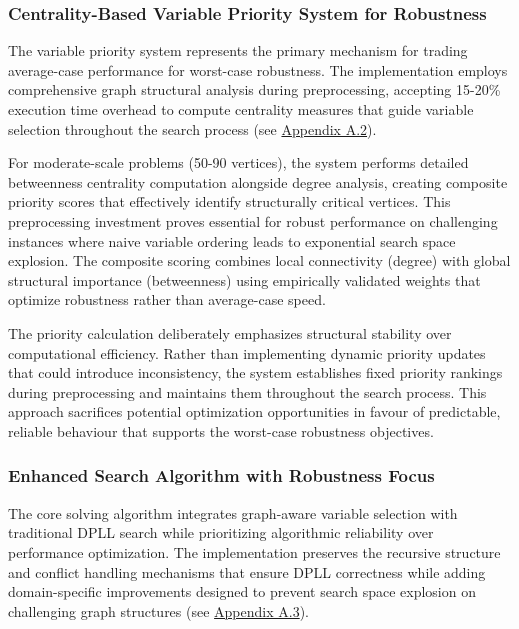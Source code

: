 \subsubsection{Centrality-Based Variable Priority System for Robustness}

The variable priority system represents the primary mechanism for trading average-case performance for worst-case robustness. The implementation employs comprehensive graph structural analysis during preprocessing, accepting 15-20\% execution time overhead to compute centrality measures that guide variable selection throughout the search process (see \hyperref[appendix:centrality-priority]{Appendix A.2}).

For moderate-scale problems (50-90 vertices), the system performs detailed betweenness centrality computation alongside degree analysis, creating composite priority scores that effectively identify structurally critical vertices. This preprocessing investment proves essential for robust performance on challenging instances where naive variable ordering leads to exponential search space explosion. The composite scoring combines local connectivity (degree) with global structural importance (betweenness) using empirically validated weights that optimize robustness rather than average-case speed.

The priority calculation deliberately emphasizes structural stability over computational efficiency. Rather than implementing dynamic priority updates that could introduce inconsistency, the system establishes fixed priority rankings during preprocessing and maintains them throughout the search process. This approach sacrifices potential optimization opportunities in favour of predictable, reliable behaviour that supports the worst-case robustness objectives.

\subsubsection{Enhanced Search Algorithm with Robustness Focus}

The core solving algorithm integrates graph-aware variable selection with traditional DPLL search while prioritizing algorithmic reliability over performance optimization. The implementation preserves the recursive structure and conflict handling mechanisms that ensure DPLL correctness while adding domain-specific improvements designed to prevent search space explosion on challenging graph structures (see \hyperref[appendix:graph-aware-search]{Appendix A.3}).


